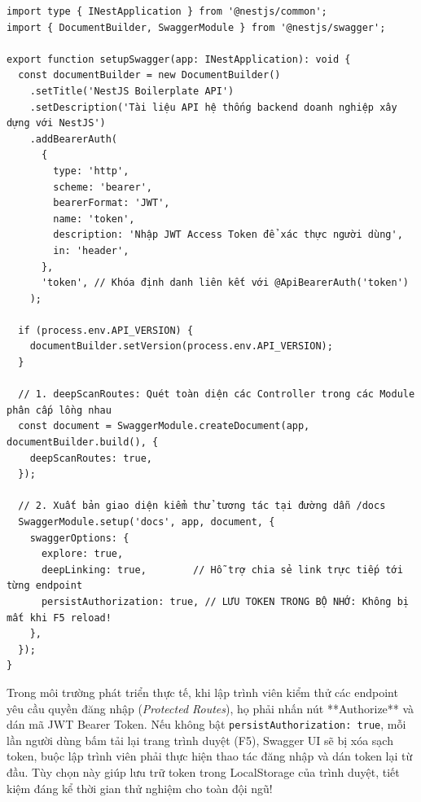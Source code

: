 \documentclass[12pt,a4paper,oneside]{book}
\begin{document}
\begin{codebox}
\begin{Verbatim}[fontsize=\small]
import type { INestApplication } from '@nestjs/common';
import { DocumentBuilder, SwaggerModule } from '@nestjs/swagger';

export function setupSwagger(app: INestApplication): void {
  const documentBuilder = new DocumentBuilder()
    .setTitle('NestJS Boilerplate API')
    .setDescription('Tài liệu API hệ thống backend doanh nghiệp xây dựng với NestJS')
    .addBearerAuth(
      {
        type: 'http',
        scheme: 'bearer',
        bearerFormat: 'JWT',
        name: 'token',
        description: 'Nhập JWT Access Token để xác thực người dùng',
        in: 'header',
      },
      'token', // Khóa định danh liên kết với @ApiBearerAuth('token')
    );

  if (process.env.API_VERSION) {
    documentBuilder.setVersion(process.env.API_VERSION);
  }

  // 1. deepScanRoutes: Quét toàn diện các Controller trong các Module phân cấp lồng nhau
  const document = SwaggerModule.createDocument(app, documentBuilder.build(), {
    deepScanRoutes: true,
  });

  // 2. Xuất bản giao diện kiểm thử tương tác tại đường dẫn /docs
  SwaggerModule.setup('docs', app, document, {
    swaggerOptions: {
      explore: true,
      deepLinking: true,        // Hỗ trợ chia sẻ link trực tiếp tới từng endpoint
      persistAuthorization: true, // LƯU TOKEN TRONG BỘ NHỚ: Không bị mất khi F5 reload!
    },
  });
}
\end{Verbatim}
\end{codebox}

\begin{infobox}
  Trong môi trường phát triển thực tế, khi lập trình viên kiểm thử các endpoint yêu cầu quyền đăng nhập (\textit{Protected Routes}), họ phải nhấn nút **Authorize** và dán mã JWT Bearer Token. Nếu không bật \texttt{persistAuthorization: true}, mỗi lần người dùng bấm tải lại trang trình duyệt (F5), Swagger UI sẽ bị xóa sạch token, buộc lập trình viên phải thực hiện thao tác đăng nhập và dán token lại từ đầu. Tùy chọn này giúp lưu trữ token trong LocalStorage của trình duyệt, tiết kiệm đáng kể thời gian thử nghiệm cho toàn đội ngũ!
\end{infobox}
\end{document}
